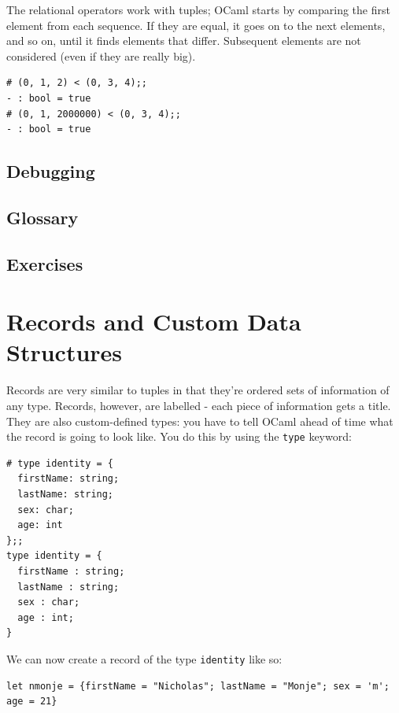 \documentclass[10pt]{book}
\begin{document}

The relational operators work with tuples;
OCaml starts by comparing the first element from each
sequence.  If they are equal, it goes on to the next elements,
and so on, until it finds elements that differ.  Subsequent
elements are not considered (even if they are really big).

\beforeverb
\begin{verbatim}
# (0, 1, 2) < (0, 3, 4);;
- : bool = true
# (0, 1, 2000000) < (0, 3, 4);;
- : bool = true
\end{verbatim}
\afterverb

\section{Debugging}

\section{Glossary}

\section{Exercises}

\chapter{Records and Custom Data Structures}

Records are very similar to tuples in that they're ordered sets of information of any type. Records, however, are labelled - each piece of information gets a title. They are also custom-defined types: you have to tell OCaml ahead of time what the record is going to look like. You do this by using the {\tt type} keyword:

\beforeverb
\begin{verbatim}
# type identity = {
  firstName: string;
  lastName: string; 
  sex: char; 
  age: int
};;
type identity = {
  firstName : string;
  lastName : string;
  sex : char;
  age : int;
}
\end{verbatim}
\afterverb

We can now create a record of the type {\tt identity} like so:

\beforeverb
\begin{verbatim}
let nmonje = {firstName = "Nicholas"; lastName = "Monje"; sex = 'm'; age = 21}
\end{verbatim}
\afterverb
\end{document}
